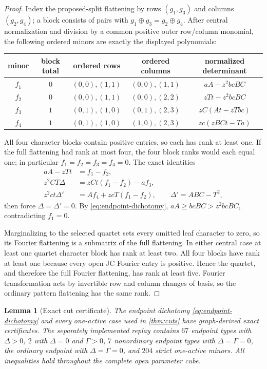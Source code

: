 \documentclass[11pt]{article}
\newtheorem{lemma}[theorem]{Lemma}
\theoremstyle{remark}
\newcommand{\xor}{\mathbin\oplus}
\begin{document}
\begin{proof}
Index the proposed-split flattening by rows $(g_1,g_3)$ and columns
$(g_2,g_4)$; a block consists of pairs with
$g_1\xor g_3=g_2\xor g_4$.  After central normalization and division by a
common positive outer row/column monomial, the following ordered minors are
exactly the displayed polynomials:
\begin{center}
\small
\begin{tabular}{ccccc}
\toprule
minor & block total & ordered rows & ordered columns & normalized determinant\\
\midrule
$f_1$&$0$&$(0,0),(1,1)$&$(0,0),(1,1)$&$aA-z^2bcBC$\\
$f_2$&$0$&$(0,0),(1,1)$&$(0,0),(2,2)$&$zTt-z^2bcBC$\\
$f_3$&$1$&$(0,1),(1,0)$&$(0,1),(2,3)$&$zC(At-zTbc)$\\
$f_4$&$1$&$(0,1),(1,0)$&$(1,0),(2,3)$&$zc(zBCt-Ta)$\\
\bottomrule
\end{tabular}
\end{center}
All four character blocks contain positive entries, so each has rank at
least one.  If the full flattening had rank at most four, the four block
ranks would each equal one; in particular $f_1=f_2=f_3=f_4=0$.  The exact
identities
\[
\begin{aligned}
aA-zTt&=f_1-f_2,\\
z^2CT\Delta&=zCt(f_1-f_2)-af_3,\\
z^2ct\Delta'&=Af_4+zcT(f_1-f_2),
\qquad \Delta'=ABC-T^2,
\end{aligned}
\]
then force $\Delta=\Delta'=0$.  By \eqref{eq:endpoint-dichotomy},
$aA\ge bcBC>z^2bcBC$, contradicting $f_1=0$.

Marginalizing to the selected quartet sets every omitted leaf character to
zero, so its Fourier flattening is a submatrix of the full flattening.  In
either central case at least one quartet character block has rank at least
two.  All four blocks have rank at least one because every open JC Fourier
entry is positive.  Hence the quartet, and therefore the full Fourier
flattening, has rank at least five.  Fourier transformation acts by invertible
row and column changes of basis, so the ordinary pattern flattening has the
same rank.

\end{proof}

\begin{lemma}[Exact cut certificate]\label{lem:cut-certificate}
The endpoint dichotomy \eqref{eq:endpoint-dichotomy} and every one-active
case used in \cref{thm:cuts} have graph-derived exact certificates.  The
separately implemented replay contains $67$ endpoint types with $\Delta>0$,
$2$ with $\Delta=0$ and $\Gamma>0$, $7$ nonordinary endpoint types with
$\Delta=\Gamma=0$, the ordinary endpoint with $\Delta=\Gamma=0$, and $204$
strict one-active minors.  All inequalities hold throughout the complete
open parameter cube.
\end{lemma}
\end{document}
